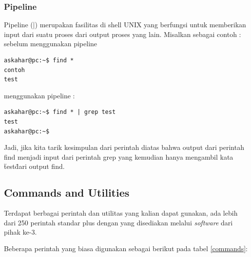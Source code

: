 \subsubsection{Pipeline}
Pipeline (|) merupakan fasilitas di shell UNIX yang berfungsi untuk memberikan input dari suatu proses dari output proses
yang lain. Misalkan sebagai contoh :
sebelum menggunakan pipeline
\begin{verbatim}
askahar@pc:~$ find *
contoh
test
\end{verbatim}

menggunakan pipeline :
\begin{verbatim}
askahar@pc:~$ find * | grep test
test
askahar@pc:~$
\end{verbatim}
Jadi, jika kita tarik kesimpulan dari perintah diatas bahwa output dari perintah find menjadi input dari perintah grep yang kemudian hanya mengambil kata \"test\" dari output find.


\subsection{Commands and Utilities}
Terdapat berbagai perintah dan utilitas yang kalian dapat gunakan, ada lebih dari 250 perintah standar plus dengan yang disediakan melalui \textit{software} dari pihak ke-3. 

Beberapa perintah yang biasa digunakan sebagai berikut pada tabel \ref{commands}:

